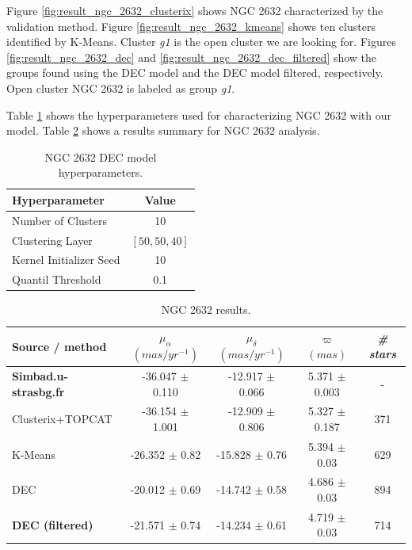 \documentclass[11pt, a4paper, english]{book}
\begin{document}
\newpage

Figure \ref{fig:result_ngc_2632_clusterix} shows NGC 2632 characterized by the validation method.
Figure \ref{fig:result_ngc_2632_kmeans} shows ten clusters identified by K-Means.
Cluster \emph{g1} is the open cluster we are looking for.
Figures \ref{fig:result_ngc_2632_dec} and \ref{fig:result_ngc_2632_dec_filtered}
show the groups found using the DEC model and the DEC model filtered, respectively.
Open cluster NGC 2632 is labeled as group \emph{g1}.

Table \ref{tab:hyperparameters_ngc_2632} shows the hyperparameters used for characterizing NGC 2632
with our model. Table \ref{tab:results_ngc_2632} shows a results summary for NGC 2632 analysis.

\vfill

\begin{table}[h]
  \begin{center}
    \begin{tabular}{l|c}
      \textbf{Hyperparameter} & \textbf{Value} \\
      \hline
      Number of Clusters & 10 \\
      Clustering Layer & $\left[ 50, 50, 40 \right]$ \\
      Kernel Initializer Seed & 10 \\
      Quantil Threshold & 0.1 \\
    \end{tabular}
    \caption{NGC 2632 DEC model hyperparameters.}
    \label{tab:hyperparameters_ngc_2632}
  \end{center}
\end{table}

\vfill

\begin{table}[h]
  \begin{center}
    \begin{tabular}{l|c|c|c|c}
      \textbf{Source / method} & \emph{$\mu_{\alpha}$ $(mas/yr^{-1})$} & \emph{$\mu_{\delta}$ $(mas/yr^{-1})$} & \emph{$\varpi$ $(mas)$} & \emph{\# stars} \\
      \hline
      \textbf{Simbad.u-strasbg.fr} & -36.047 $\pm$ 0.110 & -12.917 $\pm$ 0.066 & 5.371 $\pm$ 0.003 & - \\
      Clusterix+TOPCAT & -36.154 $\pm$ 1.001 & -12.909 $\pm$ 0.806 & 5.327 $\pm$ 0.187 & 371 \\
      K-Means & -26.352 $\pm$ 0.82 & -15.828 $\pm$ 0.76 & 5.394 $\pm$ 0.03 & 629 \\
      DEC & -20.012 $\pm$ 0.69 & -14.742 $\pm$ 0.58 & 4.686 $\pm$ 0.03 & 894 \\
      \textbf{DEC (filtered)} & -21.571 $\pm$ 0.74 & -14.234 $\pm$ 0.61 & 4.719 $\pm$ 0.03 & 714 \\
    \end{tabular}
    \caption{NGC 2632 results.}
    \label{tab:results_ngc_2632}
  \end{center}
\end{table}
\end{document}
